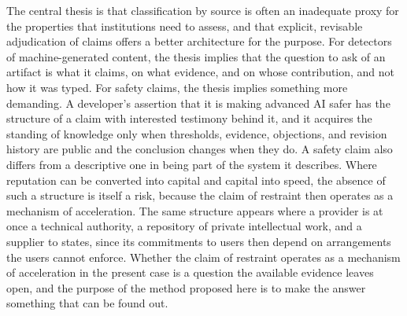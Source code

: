 \documentclass[12pt]{article}
\theoremstyle{definition}
\theoremstyle{remark}
\begin{document}
The central thesis is that classification by source is often an inadequate proxy for the properties that institutions need to assess, and that explicit, revisable adjudication of claims offers a better architecture for the purpose. For detectors of machine-generated content, the thesis implies that the question to ask of an artifact is what it claims, on what evidence, and on whose contribution, and not how it was typed. For safety claims, the thesis implies something more demanding. A developer's assertion that it is making advanced AI safer has the structure of a claim with interested testimony behind it, and it acquires the standing of knowledge only when thresholds, evidence, objections, and revision history are public and the conclusion changes when they do. A safety claim also differs from a descriptive one in being part of the system it describes. Where reputation can be converted into capital and capital into speed, the absence of such a structure is itself a risk, because the claim of restraint then operates as a mechanism of acceleration. The same structure appears where a provider is at once a technical authority, a repository of private intellectual work, and a supplier to states, since its commitments to users then depend on arrangements the users cannot enforce. Whether the claim of restraint operates as a mechanism of acceleration in the present case is a question the available evidence leaves open, and the purpose of the method proposed here is to make the answer something that can be found out.
\end{document}
